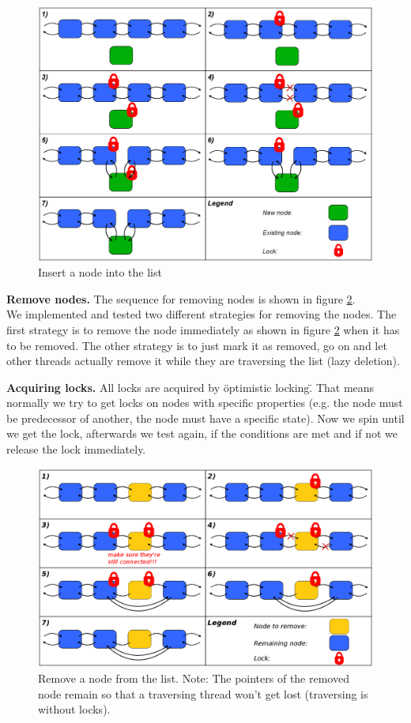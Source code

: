 \documentclass[letterpaper]{article}
\newcommand{\mypar}[1]{{\bf #1.}}
\begin{document}
\begin{figure}[h]\centering
  \includegraphics[scale=0.31]{insert.eps}
  \caption{Insert a node into the list \label{fig:insert}}
\end{figure}

\mypar{Remove nodes}
The sequence for removing nodes is shown in  figure \ref{fig:remove}.\\
We implemented and tested two different strategies for removing the nodes. The first strategy is to remove the node immediately as shown in figure \ref{fig:remove} when it has to be removed. The other strategy is to just mark it as removed, go on and let other threads actually remove it while they are traversing the list (lazy deletion).

\mypar{Acquiring locks}
All locks are acquired by \"optimistic locking\". That means normally we try to get locks on nodes with specific properties (e.g. the node must be predecessor of another, the node must have a specific state). Now we spin until we get the lock, afterwards we test again, if the conditions are met and if not we release the lock immediately.

\begin{figure}[h]\centering
  \includegraphics[scale=0.31]{remove.eps}
  \caption{Remove a node from the list. Note: The pointers of the removed node remain so that a traversing thread won't get lost (traversing is without locks). \label{fig:remove}}
\end{figure}
\end{document}
